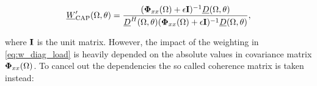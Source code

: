 \begin{equation}
\underline{W}'_\text{CAP}(\Omega,\theta) = \frac{({\mathbf{\Phi}}_{xx}(\Omega)+\epsilon\mathbf{I})^{-1} \underline{D}(\Omega,\theta) } { \underline{D}^H(\Omega,\theta) ({\mathbf{\Phi}}_{xx}(\Omega)+\epsilon\mathbf{I})^{-1} \underline{D}(\Omega,\theta) },
\label{eq:w_diag_load}
\end{equation}

where $\mathbf{I}$ is the unit matrix.
However, the impact of the weighting in \ref{eq:w_diag_load} is heavily depended on the absolute values in covariance matrix ${\mathbf{\Phi}}_{xx}(\Omega)$. To cancel out the dependencies the so called coherence matrix is taken instead:

